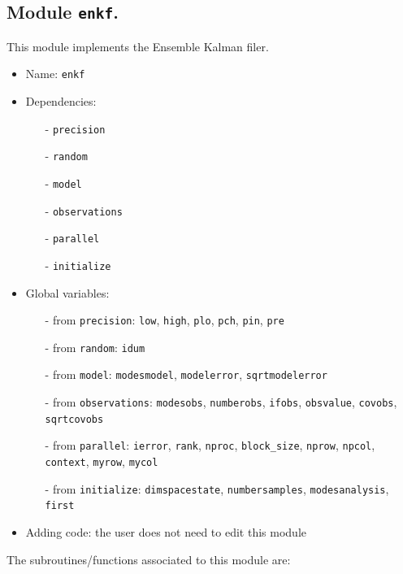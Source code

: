 \documentclass[12pt]{article}
\begin{document}
\subsection{Module {\tt enkf}.}
This module implements the Ensemble Kalman filer.
\begin{itemize}
\item Name: {\tt enkf}
\item Dependencies: 
\begin{itemize}
\item[-] {\tt precision}
\item[-] {\tt random}
\item[-] {\tt model}
\item[-] {\tt observations}
\item[-] {\tt parallel}
\item[-] {\tt initialize}
\end{itemize}
\item Global variables: 
\begin{itemize}
\item[-] from {\tt precision}: {\tt low}, {\tt high}, {\tt plo}, {\tt pch}, {\tt pin}, {\tt pre} 
\item[-] from {\tt random}: {\tt idum}
\item[-] from {\tt model}: {\tt modesmodel}, {\tt modelerror}, {\tt sqrtmodelerror}
\item[-] from {\tt observations}: {\tt modesobs}, {\tt numberobs}, {\tt ifobs}, {\tt obsvalue}, {\tt covobs}, {\tt sqrtcovobs}
\item[-] from {\tt parallel}: {\tt ierror}, {\tt rank}, {\tt nproc}, {\tt block\_size}, {\tt nprow}, {\tt npcol}, {\tt context}, {\tt myrow}, {\tt mycol}
\item[-] from {\tt initialize}: {\tt dimspacestate}, {\tt numbersamples}, {\tt modesanalysis}, {\tt first}
\end{itemize}
\item Adding code: the user does not need to edit this module
\end{itemize}

The subroutines/functions associated to this module are:
\end{document}

